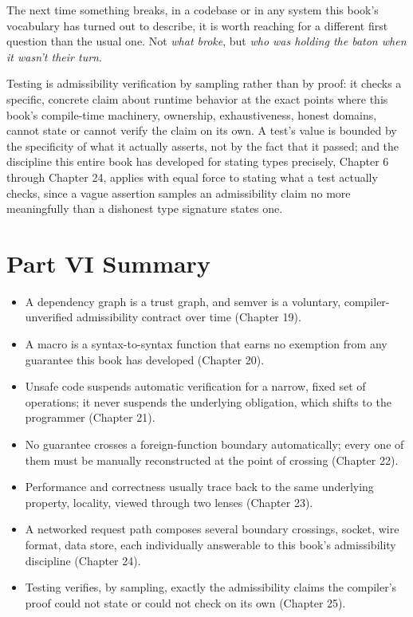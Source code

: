 \documentclass[11pt]{book}
\begin{document}
The next time something breaks, in a codebase or in any system this book's vocabulary has turned out to describe, it is worth reaching for a different first question than the usual one. Not \emph{what broke}, but \emph{who was holding the baton when it wasn't their turn}.

\begin{invariantbox}
Testing is admissibility verification by sampling rather than by proof: it checks a specific, concrete claim about runtime behavior at the exact points where this book's compile-time machinery, ownership, exhaustiveness, honest domains, cannot state or cannot verify the claim on its own. A test's value is bounded by the specificity of what it actually asserts, not by the fact that it passed; and the discipline this entire book has developed for stating types precisely, Chapter 6 through Chapter 24, applies with equal force to stating what a test actually checks, since a vague assertion samples an admissibility claim no more meaningfully than a dishonest type signature states one.
\end{invariantbox}

\clearpage

\clearpage

\section*{Part VI Summary}

\begin{itemize}
\item A dependency graph is a trust graph, and semver is a voluntary, compiler-unverified admissibility contract over time (Chapter 19).
\item A macro is a syntax-to-syntax function that earns no exemption from any guarantee this book has developed (Chapter 20).
\item Unsafe code suspends automatic verification for a narrow, fixed set of operations; it never suspends the underlying obligation, which shifts to the programmer (Chapter 21).
\item No guarantee crosses a foreign-function boundary automatically; every one of them must be manually reconstructed at the point of crossing (Chapter 22).
\item Performance and correctness usually trace back to the same underlying property, locality, viewed through two lenses (Chapter 23).
\item A networked request path composes several boundary crossings, socket, wire format, data store, each individually answerable to this book's admissibility discipline (Chapter 24).
\item Testing verifies, by sampling, exactly the admissibility claims the compiler's proof could not state or could not check on its own (Chapter 25).
\end{itemize}
\end{document}
